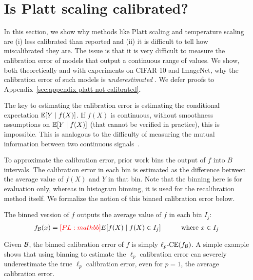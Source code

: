 \section{Is Platt scaling calibrated?}
\label{sec:challenges-measuring}

In this section, we show why  methods like Platt scaling and temperature scaling are (i) less calibrated than reported and (ii) it is difficult  to tell how miscalibrated they are. The issue is that it is very difficult to measure the calibration error of models that output a continuous range of values. We show, both theoretically and with experiments on CIFAR-10 and ImageNet, why the calibration error of such models is \emph{underestimated} .
We defer proofs to Appendix~\ref{sec:appendix-platt-not-calibrated}.

The key to estimating the calibration error is estimating the conditional expectation $\mathbb{E}[Y \mid f(X)]$.  If $f(X)$ is continuous, without smoothness assumptions on $\mathbb{E}[Y \mid f(X)]$ (that cannot be verified in practice), this is impossible. This is analogous to the difficulty of measuring the mutual information between two continuous signals~\cite{paninski2003entropy}.

To approximate the  calibration error, prior work bins the output of $f$ into $B$ intervals.
The calibration error in each bin is estimated as the difference between the average value of $f(X)$ and $Y$ in that bin.
Note that the binning here is for evaluation only, whereas in histogram binning, it is used for the recalibration method itself.
We formalize the notion of this binned calibration error below.

\begin{definition}
The binned version of $f$ outputs the average value of $f$ in each bin $I_j$:
\begin{align}
  f_{\mathcal{B}}(x) = \textcolor{red}{[PL: mathbb]} E[f(X) \mid f(X) \in I_j] \quad\quad\quad \mbox{where }x \in I_j
\end{align} 
\end{definition}

Given $\mathcal{B}{}$, the binned calibration error of $f$ is simply $\ell_p\textup{-CE}(f_{\mathcal{B}{}})$.
A simple example shows that using binning to estimate the $\ell_p$ calibration error can severely underestimate the true $\ell_p$ calibration error, even for $p=1$, the average calibration error.

